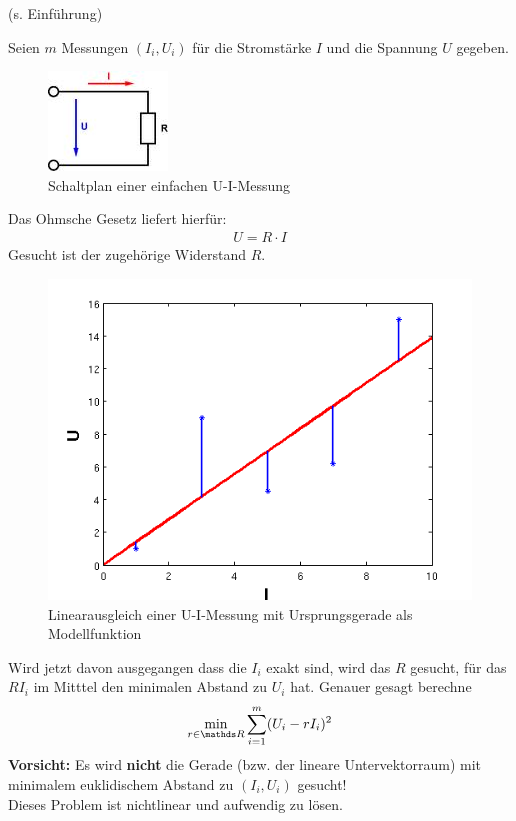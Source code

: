 \begin{Bspe}
  (s. Einführung)
  
  Seien $m$ Messungen $(I_i, U_i)$ für die Stromstärke $I$ und die Spannung $U$ gegeben. \\
  
  \begin{figure}
    \parbox{\linewidth}{
      \centering
      \includegraphics{images/ohmsche.jpeg}
    }
    \caption{Schaltplan einer einfachen U-I-Messung}
  \end{figure}
  
  Das Ohmsche Gesetz liefert hierfür:
  \begin{gather*}
    U=R\cdot I
  \end{gather*}
  Gesucht ist der zugehörige Widerstand $R$.\\
  
  \begin{figure}
    \parbox{\linewidth}{
      \centering
      \includegraphics[width=0.5\linewidth]{images/linausgl2.png}
    }
    \caption{Linearausgleich einer U-I-Messung mit Ursprungsgerade als Modellfunktion}
  \end{figure}
  
  Wird jetzt davon ausgegangen dass die $I_i$ exakt sind, wird das $R$ gesucht, 
  für das $RI_i$ im Mitttel den minimalen Abstand zu $U_i$ hat.
  Genauer gesagt berechne
  \begin{gather*}
    \min_{r\in\R} \sum_{i=1}^{m}(U_i-rI_i)^2
  \end{gather*}
  \textbf{Vorsicht: } Es wird \textbf{nicht} die Gerade (bzw. der lineare Untervektorraum) mit 
  minimalem euklidischem Abstand zu $(I_i,U_i)$ gesucht! \\
  Dieses Problem ist nichtlinear und aufwendig zu lösen.
\end{Bspe}


